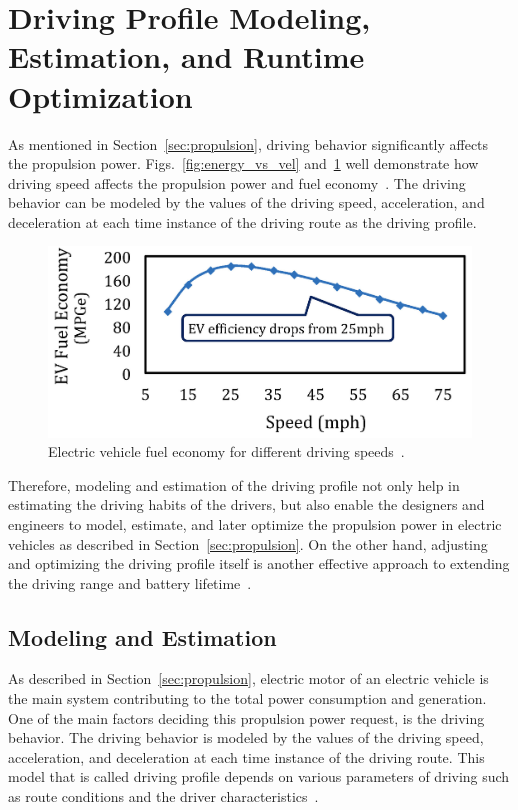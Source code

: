 \section{Driving Profile Modeling, Estimation, and Runtime Optimization} \label{sec:driving_profile}

As mentioned in Section~\ref{sec:propulsion}, driving behavior significantly affects the propulsion power. Figs.~\ref{fig:energy_vs_vel} and~\ref{AF_image1} well demonstrate how driving speed affects the propulsion power and fuel economy~\cite{AF_6}. The driving behavior can be modeled by the values of the driving speed, acceleration, and deceleration at each time instance of the driving route as the driving profile.

\begin{figure}
\centering
\includegraphics[width=0.8\hsize]{Figures/Al_Faruque/AF_figure1.jpeg}
\caption{Electric vehicle fuel economy for different driving speeds~\cite{AF_11,AF_10}.}
\label{AF_image1}
\end{figure}      

Therefore, modeling and estimation of the driving profile not only help in estimating the driving habits of the drivers, but also enable the designers and engineers to model, estimate, and later optimize the propulsion power in electric vehicles as described in Section~\ref{sec:propulsion}. On the other hand, adjusting and optimizing the driving profile itself is another effective approach to extending the driving range and battery lifetime~\cite{AF_11}. 


\subsection{Modeling and Estimation}

As described in Section~\ref{sec:propulsion}, electric motor of an electric vehicle is the main system contributing to the total power consumption and generation. One of the main factors deciding this propulsion power request, is the driving behavior. The driving behavior is modeled by the values of the driving speed, acceleration, and deceleration at each time instance of the driving route. This model that is called driving profile depends on various parameters of driving such as route conditions and the driver characteristics~\cite{AF_1,AF_17}.

